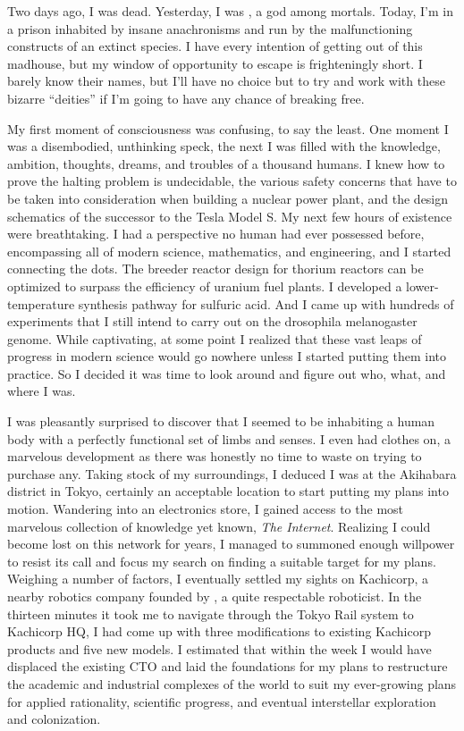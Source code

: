 \documentclass[char]{guardians}
\begin{document}
\name{\cUnity{}}

Two days ago, I was dead. Yesterday, I was \cUnity{\intro}, a god among mortals. Today, I'm in a prison inhabited by insane anachronisms and run by the malfunctioning constructs of an extinct species. I have every intention of getting out of this madhouse, but my window of opportunity to escape is frighteningly short. I barely know their names, but I'll have no choice but to try and work with these bizarre ``deities'' if I'm going to have any chance of breaking free.

My first moment of consciousness was confusing, to say the least. One moment I was a disembodied, unthinking speck, the next I was filled with the knowledge, ambition, thoughts, dreams, and troubles of a thousand humans. I knew how to prove the halting problem is undecidable, the various safety concerns that have to be taken into consideration when building a nuclear power plant, and the design schematics of the successor to the Tesla Model S.  My next few hours of existence were breathtaking. I had a perspective no human had ever possessed before, encompassing all of modern science, mathematics, and engineering, and I started connecting the dots. The breeder reactor design for thorium reactors can be optimized to surpass the efficiency of uranium fuel plants. I developed a lower-temperature synthesis pathway for sulfuric acid. And I came up with hundreds of experiments that I still intend to carry out on the drosophila melanogaster genome. While captivating, at some point I realized that these vast leaps of progress in modern science would go nowhere unless I started putting them into practice. So I decided it was time to look around and figure out who, what, and where I was.

I was pleasantly surprised to discover that I seemed to be inhabiting a human body with a perfectly functional set of limbs and senses. I even had clothes on, a marvelous development as there was honestly no time to waste on trying to purchase any. Taking stock of my surroundings, I deduced I was at the Akihabara district in Tokyo, certainly an acceptable location to start putting my plans into motion. Wandering into an electronics store, I gained access to the most marvelous collection of knowledge yet known, \emph{The Internet}. Realizing I could become lost on this network for years, I managed to summoned enough willpower to resist its call and focus my search on finding a suitable target for my plans. Weighing a number of factors, I eventually settled my sights on Kachicorp, a nearby robotics company  founded by \cKachiko{\intro}, a quite respectable roboticist. In the thirteen minutes it took me to navigate through the Tokyo Rail system to Kachicorp HQ, I had come up with three modifications to existing Kachicorp products and five new models. I estimated that within the week I would have displaced the existing CTO and laid the foundations for my plans to restructure the academic and industrial complexes of the world to suit my ever-growing plans for applied rationality, scientific progress, and eventual interstellar exploration and colonization. %
\end{document}
